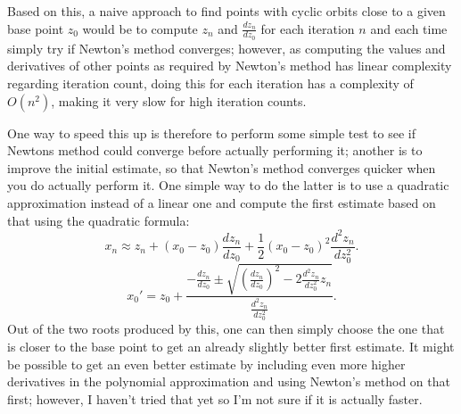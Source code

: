 \documentclass[12pt,a4paper]{article}
\begin{document}
Based on this, a naive approach to find points with cyclic orbits close to a given base point $z_0$ would be to compute $z_n$ and $\frac{dz_n}{dz_0}$ for each iteration $n$ and each time simply try if Newton's method converges; however, as computing the values and derivatives of other points as required by Newton's method has linear complexity regarding iteration count, doing this for each iteration has a complexity of $O(n^2)$, making it very slow for high iteration counts.

One way to speed this up is therefore to perform some simple test to see if Newtons method could converge before actually performing it; another is to improve the initial estimate, so that Newton's method converges quicker when you do actually perform it. One simple way to do the latter is to use a quadratic approximation instead of a linear one and compute the first estimate based on that using the quadratic formula:
$$x_n \approx z_n+(x_0-z_0)\frac{dz_n}{dz_0}+\frac{1}{2}(x_0-z_0)^2\frac{d^2z_n}{dz_0^2}.$$
$$x_0' = z_0+\frac{-\frac{dz_n}{dz_0}\pm\sqrt{(\frac{dz_n}{dz_0})^2-2\frac{d^2z_n}{dz_0^2}z_n}}{\frac{d^2z_n}{dz_0^2}}.$$
Out of the two roots produced by this, one can then simply choose the one that is closer to the base point to get an already slightly better first estimate. It might be possible to get an even better estimate by including even more higher derivatives in the polynomial approximation and using Newton's method on that first; however, I haven't tried that yet so I'm not sure if it is actually faster.
\end{document}
